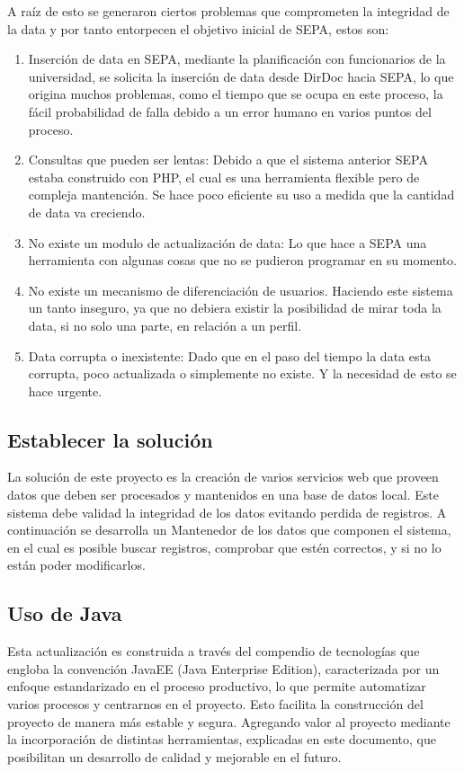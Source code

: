 \documentclass[a4paper,12pt,openany,oneside]{book}
\begin{document}
A raíz de esto se generaron ciertos problemas que comprometen la integridad de la data y por tanto entorpecen el objetivo inicial de SEPA, estos son:

\begin{enumerate}
	\item Inserción de data en SEPA, mediante la planificación con funcionarios de la universidad, se solicita la inserción de data desde DirDoc hacia SEPA, lo que origina muchos problemas, como el tiempo que se ocupa en este proceso, la fácil probabilidad de falla debido a un error humano en varios puntos del proceso.
	\item Consultas que pueden ser lentas: Debido a que el sistema anterior SEPA estaba construido con PHP, el cual es una herramienta flexible pero de compleja mantención. Se hace poco eficiente su uso a medida que la cantidad de data va creciendo.
	\item No existe un modulo de actualización de data: Lo que hace a SEPA una herramienta con algunas cosas que no se pudieron programar en su momento.
	\item No existe un mecanismo de diferenciación de usuarios. Haciendo este sistema un tanto inseguro, ya que no debiera existir la posibilidad de mirar toda la data, si no solo una parte, en relación a un perfil.
	\item Data corrupta o inexistente: Dado que en el paso del tiempo la data esta corrupta, poco actualizada o simplemente no existe. Y la necesidad de esto se hace urgente.
\end{enumerate}
\subsection{Establecer la solución}
La solución de este proyecto es la creación de varios servicios web que proveen datos que deben ser procesados y mantenidos en una base de datos local. Este sistema debe validad la integridad de los datos evitando perdida de registros. A continuación se desarrolla un Mantenedor de los datos que componen el sistema, en el cual es posible buscar registros, comprobar que estén correctos, y si no lo están poder modificarlos.
\subsection{Uso de Java}
Esta actualización es construida a través del compendio de tecnologías que engloba la convención JavaEE (Java Enterprise Edition), caracterizada por un enfoque estandarizado en el proceso productivo, lo que permite automatizar varios procesos y centrarnos en el proyecto. Esto facilita la construcción del proyecto de manera más estable y segura. Agregando valor al proyecto mediante la incorporación de distintas herramientas, explicadas en este documento, que posibilitan un desarrollo de calidad y mejorable en el futuro.
\end{document}

